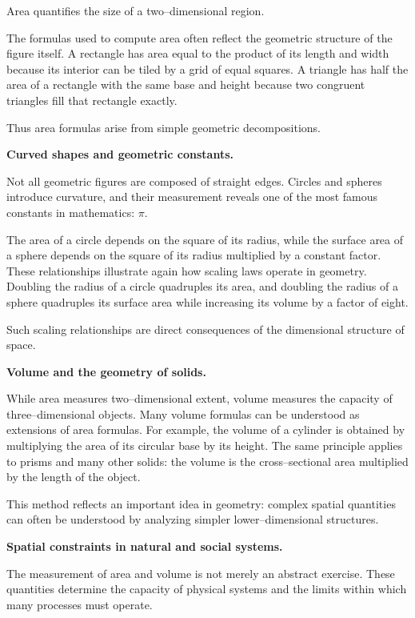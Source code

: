 \documentclass[11pt, openany]{book}
\theoremstyle{plain}
\theoremstyle{definition}
\theoremstyle{remark}
\newcounter{exercise}[chapter]
\begin{document}
Area quantifies the size of a two–dimensional region.

The formulas used to compute area often reflect the geometric structure
of the figure itself. A rectangle has area equal to the product of its
length and width because its interior can be tiled by a grid of equal
squares. A triangle has half the area of a rectangle with the same base
and height because two congruent triangles fill that rectangle exactly.

Thus area formulas arise from simple geometric decompositions.

\medskip

\textbf{Curved shapes and geometric constants.}

Not all geometric figures are composed of straight edges. Circles and
spheres introduce curvature, and their measurement reveals one of the
most famous constants in mathematics: $\pi$.

The area of a circle depends on the square of its radius, while the
surface area of a sphere depends on the square of its radius multiplied
by a constant factor. These relationships illustrate again how scaling
laws operate in geometry. Doubling the radius of a circle quadruples its
area, and doubling the radius of a sphere quadruples its surface area
while increasing its volume by a factor of eight.

Such scaling relationships are direct consequences of the dimensional
structure of space.

\medskip

\textbf{Volume and the geometry of solids.}

While area measures two–dimensional extent, volume measures the capacity
of three–dimensional objects. Many volume formulas can be understood as
extensions of area formulas. For example, the volume of a cylinder is
obtained by multiplying the area of its circular base by its height.
The same principle applies to prisms and many other solids: the volume
is the cross–sectional area multiplied by the length of the object.

This method reflects an important idea in geometry: complex spatial
quantities can often be understood by analyzing simpler lower–dimensional
structures.

\medskip

\textbf{Spatial constraints in natural and social systems.}

The measurement of area and volume is not merely an abstract exercise.
These quantities determine the capacity of physical systems and the
limits within which many processes must operate.
\end{document}
